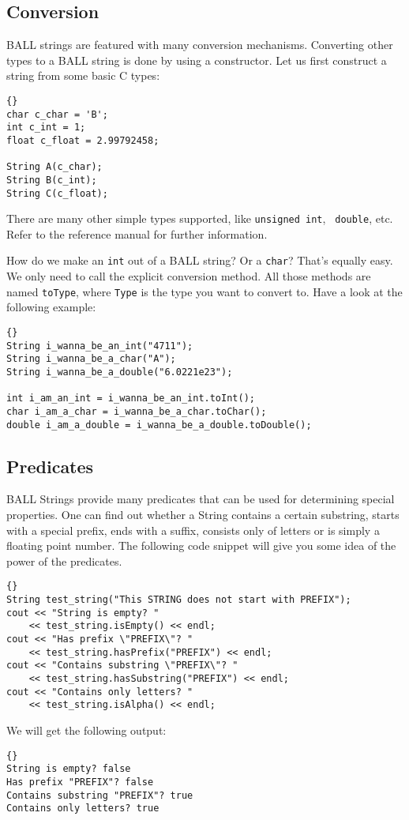 \subsection{Conversion}

BALL strings are featured with many conversion mechanisms. Converting other
types to a BALL string is done by using a constructor. Let us first construct
a string from some basic C types:
\begin{lstlisting}{}
char c_char = 'B';
int c_int = 1;
float c_float = 2.99792458;

String A(c_char);
String B(c_int);
String C(c_float);
\end{lstlisting}
There are many other simple types supported, like {\tt unsigned int}, {\tt
double}, etc. Refer to the reference manual for further information.

\noindent
How do we make an {\tt int} out of a BALL string? Or a {\tt char}? That's
equally easy. We only need to call the explicit conversion method. All those
methods are named {\tt toType}, where {\tt Type} is the type you want to
convert to. Have a look at the following example:
\begin{lstlisting}{}
String i_wanna_be_an_int("4711");
String i_wanna_be_a_char("A");
String i_wanna_be_a_double("6.0221e23");

int i_am_an_int = i_wanna_be_an_int.toInt();
char i_am_a_char = i_wanna_be_a_char.toChar();
double i_am_a_double = i_wanna_be_a_double.toDouble();
\end{lstlisting}

\subsection{Predicates}

BALL Strings provide many predicates that can be used for determining special
properties. One can find out whether a String contains a certain substring, 
starts with a special prefix, ends with a suffix, consists only of letters or 
is simply a floating point number. The following code snippet will give you
some idea of the power of the predicates.
\begin{lstlisting}{}
String test_string("This STRING does not start with PREFIX");
cout << "String is empty? " 
	<< test_string.isEmpty() << endl;
cout << "Has prefix \"PREFIX\"? " 
	<< test_string.hasPrefix("PREFIX") << endl;
cout << "Contains substring \"PREFIX\"? " 
	<< test_string.hasSubstring("PREFIX") << endl;
cout << "Contains only letters? "
	<< test_string.isAlpha() << endl;
\end{lstlisting}
We will get the following output:
\begin{lstlisting}{}
String is empty? false
Has prefix "PREFIX"? false
Contains substring "PREFIX"? true
Contains only letters? true
\end{lstlisting}

